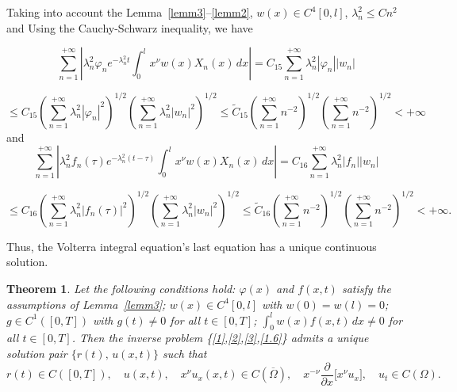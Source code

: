 \documentclass[reqno]{amsart}
\newtheorem{thm}{Theorem}[section]
\theoremstyle{definition}
\numberwithin{equation}{section}
\begin{document}
Taking into account the Lemma~\ref{lemm3}--\ref{lemm2}, $w(x) \in C^4[0, l]$, $\lambda_n^2\leq Cn^2$ and  Using the Cauchy-Schwarz inequality, we have 

\begin{equation*}
    \sum_{n=1}^{+\infty}\left|\lambda_n^2\varphi_n e^{-\lambda_n^2 t}
\int_{0}^{l} x^{\nu}w(x)X_n(x)\,dx\right| = C_{15} \sum_{n=1}^{+\infty}\lambda_n^2|\varphi_n||w_n|
\end{equation*}

\begin{equation*}
  \leq C_{15}\left(\sum_{n=1}^{+\infty}\lambda_n^2|\varphi_n|^2\right)^{1/2}\left(\sum_{n=1}^{+\infty}\lambda_n^2|w_n|^2\right)^{1/2}\leq \tilde{C}_{15}\left(\sum_{n=1}^{+\infty}n^{-2}\right)^{1/2}\left(\sum_{n=1}^{+\infty}n^{-2}\right)^{1/2}<+\infty
\end{equation*}
and 
\begin{equation*}
    \sum_{n=1}^{+\infty}\left|\lambda_n^2 f_n(\tau)
e^{-\lambda_n^2 (t-\tau)}
\int_{0}^{l} x^{\nu}w(x)X_n(x)\,dx\right|=C_{16} \sum_{n=1}^{+\infty}\lambda_n^2|f_n||w_n|
\end{equation*}

\begin{equation*}
    \leq C_{16}\left(\sum_{n=1}^{+\infty}\lambda_n^2\left|f_n(\tau)\right|^2\right)^{1/2}\left(\sum_{n=1}^{+\infty}\lambda_n^2\left|w_n\right|^2\right)^{1/2}\leq \tilde{C}_{16}\left(\sum_{n=1}^{+\infty}n^{-2}\right)^{1/2}\left(\sum_{n=1}^{+\infty}n^{-2}\right)^{1/2}<+\infty.
\end{equation*}



 Thus, the Volterra integral equation's last equation has a unique continuous solution.




\begin{thm}\label{3.5}
   Let the following conditions hold:
 $\varphi(x)$ and $f(x,t)$ satisfy the assumptions of Lemma~\ref{lemm3}; $w(x) \in C^{4}[0,l]$ with $w(0) = w(l) = 0$; $g \in C^{1}([0,T])$ with $g(t) \neq 0$ for all $t \in [0,T]$;  $\displaystyle\int_{0}^{l} w(x)f(x,t)\,dx \neq 0$ for all $t \in [0,T]$.
Then the inverse problem \{\eqref{1},\eqref{2},\eqref{3},\eqref{1.6}\} admits a unique solution
pair $\{r(t),\,u(x,t)\}$ such that
\begin{equation*}
    r(t) \in C([0,T]),\quad u(x,t),\quad x^{\nu}u_{x}(x,t) \in C(\overline{\Omega}),\quad x^{-\nu}\frac{\partial}{\partial x}\bigl[x^{\nu}u_{x}\bigr],\quad
    u_{t} \in C(\Omega).
\end{equation*}

\end{thm}
\end{document}
